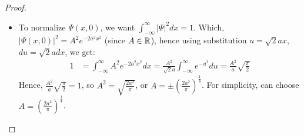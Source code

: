 \documentclass{article}
\begin{document}
\begin{proof}

    \hfil

    \begin{itemize}
        \item[1.] To normalize $\Psi(x,0)$, we want $\int_{-\infty}^{\infty}|\Psi|^2 dx=1$. Which, $|\Psi(x,0)|^2 = A^2e^{-2a^2x^2}$ (since $A\in\mathbb{R}$), hence using substitution $u=\sqrt{2}ax$, $du=\sqrt{2}adx$, we get:
        \begin{align}
            1&=\int_{-\infty}^{\infty}A^2e^{-2a^2x^2}dx = \frac{A^2}{\sqrt{2}a}\int_{-\infty}^{\infty}e^{-u^2}du = \frac{A^2}{a}\sqrt{\frac{\pi}{2}}
        \end{align}
        Hence, $\frac{A^2}{a}\sqrt{\frac{\pi}{2}}=1$, so $A^2 = \sqrt{\frac{2a^2}{\pi}}$, or $A=\pm\left(\frac{2a^2}{\pi}\right)^\frac{1}{4}$. For simplicity, can choose $A=\left(\frac{2a^2}{\pi}\right)^\frac{1}{4}$.

        \hfil


\end{itemize}
\end{proof}
\end{document}
